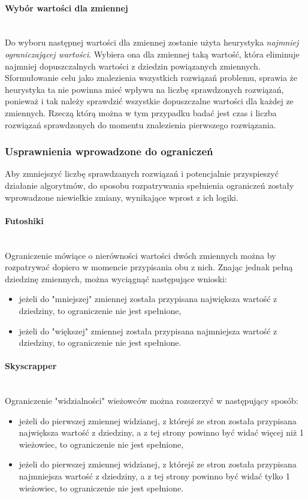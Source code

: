 \documentclass{article}
\begin{document}
	\paragraph{Wybór wartości dla zmiennej}\mbox{}\\
	Do wyboru następnej wartości dla zmiennej zostanie użyta heurystyka \textit{najmniej ograniczającej wartości}. Wybiera ona dla zmiennej taką wartość, która eliminuje najmniej dopuszczalnych wartości z dziedzin powiązanych zmiennych.\\
	Sformułowanie celu jako znalezienia wszystkich rozwiązań problemu, sprawia że heurystyka ta nie powinna mieć wpływu na liczbę sprawdzonych rozwiązań, ponieważ i tak należy sprawdzić wszystkie dopuszczalne wartości dla każdej ze zmiennych. Rzeczą którą można w tym przypadku badać jest czas i liczba rozwiązań sprawdzonych do momentu znalezienia pierwszego rozwiązania.
	\subsubsection{Usprawnienia wprowadzone do ograniczeń}
	Aby zmniejszyć liczbę sprawdzanych rozwiązań i potencjalnie przyspieszyć działanie algorytmów, do sposobu rozpatrywania spełnienia ograniczeń zostały wprowadzone niewielkie zmiany, wynikające wprost z ich logiki.
	\paragraph{Futoshiki}\mbox{}\\
	Ograniczenie mówiące o nierówności wartości dwóch zmiennych można by rozpatrywać dopiero w momencie przypisania obu z nich. Znając jednak pełną dziedzinę zmiennych, można wyciągnąć następujące wnioski:
	\begin{itemize}
		\item jeżeli do "mniejszej" zmiennej została przypisana największa wartość z dziedziny, to ograniczenie nie jest spełnione,
		\item jeżeli do "większej" zmiennej została przypisana najmniejsza wartość z dziedziny, to ograniczenie nie jest spełnione.
	\end{itemize}
	\paragraph{Skyscrapper}\mbox{}\\
	Ograniczenie "widzialności" wieżowców można rozszerzyć w następujący sposób:
	\begin{itemize}
		\item jeżeli do pierwszej zmiennej widzianej, z którejś ze stron została przypisana największa wartość z dziedziny, a z tej strony powinno być widać więcej niż 1 wieżowiec, to ograniczenie nie jest spełnione,
		\item jeżeli do pierwszej zmiennej widzianej, z którejś ze stron została przypisana najmniejsza wartość z dziedziny, a z tej strony powinno być widać tylko 1 wieżowiec, to ograniczenie nie jest spełnione.
	\end{itemize}
\end{document}
